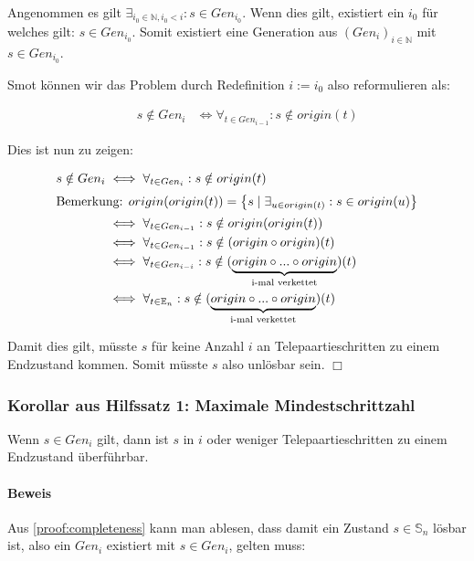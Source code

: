 \documentclass[a4paper,10pt,ngerman]{scrartcl}
\begin{document}
Angenommen es gilt \(\exists_{i_0\in\mathbb{N}, i_0 < i}: s \in Gen_{i_0}\). Wenn dies gilt, existiert ein \(i_0\) für welches gilt: \(s \in Gen_{i_0}\). Somit existiert eine Generation aus \((Gen_i)_{i\in\mathbb{N}}\) mit \(s \in Gen_{i_0}\).

Smot können wir das Problem durch Redefinition \(i := i_0\) also reformulieren als:

\begin{align*}
    &&s \notin Gen_{i} 
    &\iff \forall_{t \in Gen_{i-1}} : s \notin origin(t)
\end{align*}

Dies ist nun zu zeigen:

\begin{align*}
    s \notin Gen_{i}
    &\iff \forall_{t \in Gen_i} : s \notin origin(t) \\
    \intertext{Bemerkung: \(origin(origin(t)) = \left\{ s \mid \exists_{u \in origin(t)} : s \in origin(u) \right\}\)}
    &\iff \forall_{t \in Gen_{i-1}} : s \notin origin(origin(t)) \\
    &\iff \forall_{t \in Gen_{i-1}} : s \notin (origin \circ origin)(t) \\
    &\iff \forall_{t \in Gen_{i-i}} : s \notin (\underbrace{origin \circ ... \circ origin}_{\text{i-mal verkettet}})(t) \\
    &\iff \forall_{t \in \mathbb{E}_n} : s \notin (\underbrace{origin \circ ... \circ origin}_{\text{i-mal verkettet}})(t) \\
\end{align*}

Damit dies gilt, müsste \(s\) für keine Anzahl \(i\) an Telepaartieschritten zu einem Endzustand kommen. Somit müsste \(s\) also unlösbar sein. \(\Box\)

\subsubsection{Korollar aus Hilfssatz 1: Maximale Mindestschrittzahl} \label{proof:maxminsteps}

Wenn \(s \in Gen_i\) gilt, dann ist \(s\) in \(i\) oder weniger Telepaartieschritten zu einem Endzustand überführbar.

\paragraph{Beweis}

Aus \cref{proof:completeness} kann man ablesen, dass damit ein Zustand \(s\in\mathbb{S}_n\) lösbar ist, also ein \(Gen_i\) existiert mit \(s \in Gen_i\), gelten muss:
\end{document}
